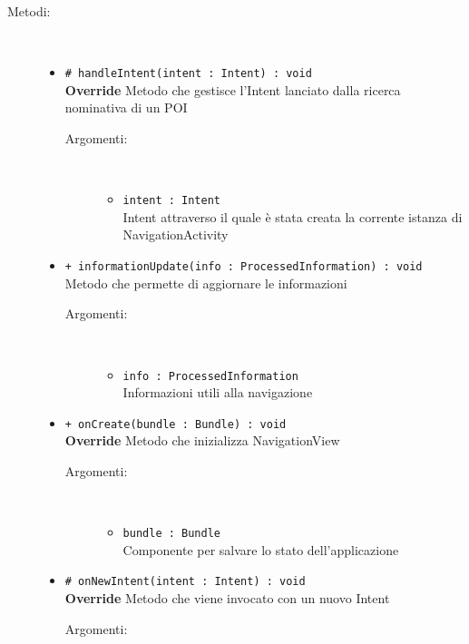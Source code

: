 \documentclass[../DefinizioneDiProdotto.tex]{subfiles}
\begin{document}
\begin{description}
\begin{itemize}
	\end{itemize}
	\item[Metodi:] \
	\begin{itemize}
		\item \texttt{\# handleIntent(intent : Intent) : void}\\
		\textbf{Override} Metodo che gestisce l'Intent lanciato dalla ricerca nominativa di un POI
		\begin{description}
			\item[Argomenti:] \
			\begin{itemize}
				\item \texttt{intent : Intent}\\
				Intent attraverso il quale è stata creata la corrente istanza di NavigationActivity\end{itemize}
		\end{description}
		\item \texttt{+ informationUpdate(info : ProcessedInformation) : void}\\
		Metodo che permette di aggiornare le informazioni
		\begin{description}
			\item[Argomenti:] \
			\begin{itemize}
				\item \texttt{info : ProcessedInformation}\\
				Informazioni utili alla navigazione\end{itemize}
		\end{description}
		\item \texttt{+ onCreate(bundle : Bundle) : void}\\
		\textbf{Override} Metodo che inizializza NavigationView
		\begin{description}
			\item[Argomenti:] \
			\begin{itemize}
				\item \texttt{bundle : Bundle}\\
				Componente per salvare lo stato dell'applicazione\end{itemize}
		\end{description}
		\item \texttt{\# onNewIntent(intent : Intent) : void}\\
		\textbf{Override} Metodo che viene invocato con un nuovo Intent
		\begin{description}
			\item[Argomenti:] \
			\begin{itemize}

\end{itemize}
\end{description}
\end{itemize}
\end{description}
\end{document}
